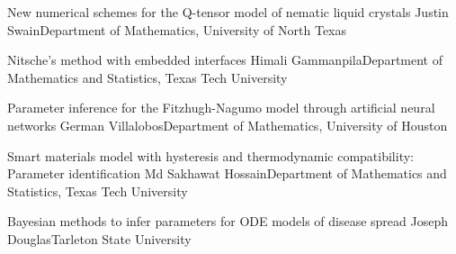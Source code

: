 \begin{postersPG}
\item\poster %
{New numerical schemes for the Q-tensor model of nematic liquid crystals}
{Justin Swain}{Department of Mathematics, University of North Texas}

\item\poster %
{Nitsche’s method with embedded interfaces}
{Himali Gammanpila}{Department of Mathematics and Statistics, Texas Tech University}

\item\poster %
{Parameter inference for the Fitzhugh-Nagumo model through artificial neural networks}
{German Villalobos}{Department of Mathematics, University of Houston}

\item\poster %
{Smart materials model with hysteresis and thermodynamic compatibility: Parameter identification}
{Md Sakhawat Hossain}{Department of Mathematics and Statistics, Texas Tech University}


\item\poster %
{Bayesian methods to infer parameters for ODE models of disease spread}
{Joseph Douglas}{Tarleton State University}


\end{postersPG}

\room


